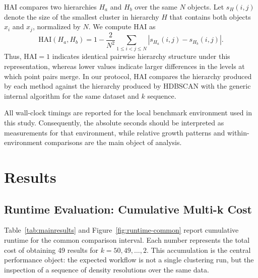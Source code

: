 \documentclass[11pt]{article}
\begin{document}
HAI compares two hierarchies \(H_a\) and \(H_b\) over the same \(N\) objects. Let \(s_H(i,j)\) denote the size of the smallest cluster in hierarchy \(H\) that contains both objects \(x_i\) and \(x_j\), normalized by \(N\). We compute HAI as
\begin{equation}
  \mathrm{HAI}(H_a,H_b)
  =
  1 -
  \frac{2}{N^2}
  \sum_{1 \leq i < j \leq N}
  \left|s_{H_a}(i,j) - s_{H_b}(i,j)\right|.
\end{equation}
Thus, \(\mathrm{HAI}=1\) indicates identical pairwise hierarchy structure under this representation, whereas lower values indicate larger differences in the levels at which point pairs merge. In our protocol, HAI compares the hierarchy produced by each method against the hierarchy produced by HDBSCAN with the generic internal algorithm for the same dataset and \(k\) sequence.

All wall-clock timings are reported for the local benchmark environment used in this study. Consequently, the absolute seconds should be interpreted as measurements for that environment, while relative growth patterns and within-environment comparisons are the main object of analysis.

\section{Results}
\label{sec:results}

\subsection{Runtime Evaluation: Cumulative Multi-k Cost}

Table~\ref{tab:mainresults} and Figure~\ref{fig:runtime-common} report cumulative runtime for the common comparison interval. Each number represents the total cost of obtaining 49 results for \(k=50,49,\ldots,2\). This accumulation is the central performance object: the expected workflow is not a single clustering run, but the inspection of a sequence of density resolutions over the same data.
\end{document}
